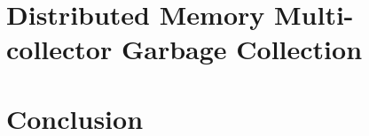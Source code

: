 \documentclass[12pt,letterpaper]{report}
\begin{document}
\begin{doublespace}
  \chapter{Distributed Memory Multi-collector Garbage Collection}
     \label{distributed}
     
\chapter{Conclusion}
\label{conc}

  \end{doublespace}

\newpage 




%

\begin{singlespace}


\end{singlespace}


\newpage 
  \begin{doublespace}

  \end{doublespace}
\end{document}
